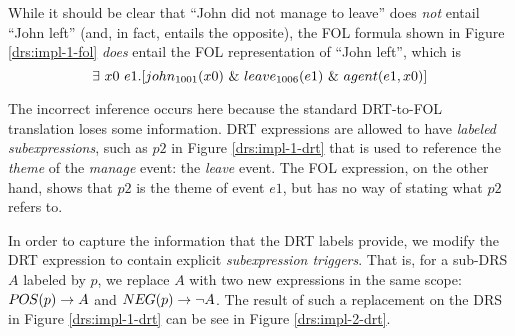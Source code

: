 While it should be clear that ``John did not manage to leave'' does {\it not}
entail ``John left'' (and, in fact, entails the opposite), the FOL formula shown
in Figure \ref{drs:impl-1-fol} {\it does} entail the FOL representation of
``John left'', which is \[ \exists~ x0~e1.[john_{1001}(x0) ~\&~
leave_{1006}(e1) ~\&~ agent(e1, x0)] \]  

The incorrect inference occurs here because the standard DRT-to-FOL translation
loses some information.  DRT expressions are allowed to have {\it labeled
subexpressions}, such as $p2$ in Figure \ref{drs:impl-1-drt} that is used to
reference the {\it theme} of the {\it manage} event: the {\it leave} event.  The
FOL expression, on the other hand, shows that $p2$ is the theme of event $e1$,
but has no way of stating what $p2$ refers to.

In order to capture the information that the DRT labels provide, we modify the
DRT expression to contain explicit {\it subexpression triggers}.  That is, for a
sub-DRS $A$ labeled by $p$, we replace $A$ with two new expressions in the same
scope: $\POS{p} \to A$ and $\NEG{p} \to \lnot A$.  The result of such a
replacement on the DRS in Figure \ref{drs:impl-1-drt} can be see in Figure
\ref{drs:impl-2-drt}.   

